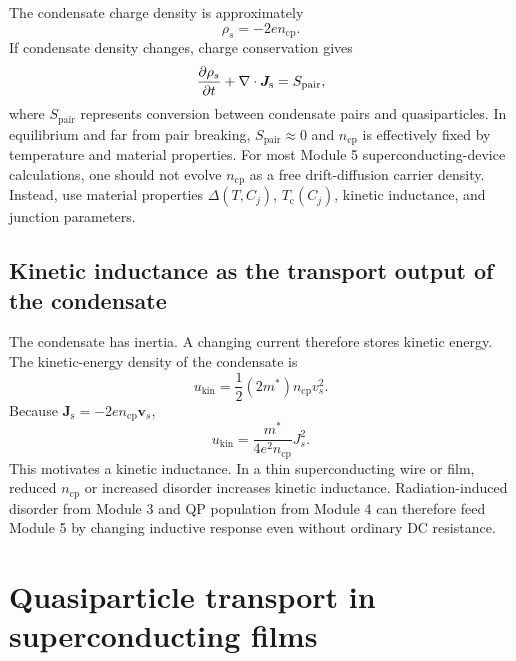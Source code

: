 \documentclass[11pt]{article}
\newcommand{\Tc}{T_{\mathrm{c}}}
\newcommand{\ncp}{n_{\mathrm{cp}}}
\newcommand{\Js}{\bm{J}_{\mathrm{s}}}
\begin{document}
The condensate charge density is approximately
\begin{equation}
\rho_s=-2e\ncp.
\end{equation}
If condensate density changes, charge conservation gives
\begin{equation}
\pdv{\rho_s}{t}+\nabla\cdot\Js = S_{\mathrm{pair}},
\end{equation}
where \(S_{\mathrm{pair}}\) represents conversion between condensate pairs and quasiparticles. In equilibrium and far from pair breaking, \(S_{\mathrm{pair}}\approx 0\) and \(\ncp\) is effectively fixed by temperature and material properties. For most Module 5 superconducting-device calculations, one should not evolve \(\ncp\) as a free drift-diffusion carrier density. Instead, use material properties \(\Delta(T,C_j)\), \(\Tc(C_j)\), kinetic inductance, and junction parameters.

\subsection{Kinetic inductance as the transport output of the condensate}

The condensate has inertia. A changing current therefore stores kinetic energy. The kinetic-energy density of the condensate is
\begin{equation}
 u_{\mathrm{kin}}=\frac{1}{2}(2m^*)\ncp v_s^2.
\end{equation}
Because \(\Js=-2e\ncp \bm{v}_s\),
\begin{equation}
 u_{\mathrm{kin}}=\frac{m^*}{4e^2\ncp}J_s^2.
\end{equation}
This motivates a kinetic inductance. In a thin superconducting wire or film, reduced \(\ncp\) or increased disorder increases kinetic inductance. Radiation-induced disorder from Module 3 and QP population from Module 4 can therefore feed Module 5 by changing inductive response even without ordinary DC resistance.

\section{Quasiparticle transport in superconducting films}
\end{document}
